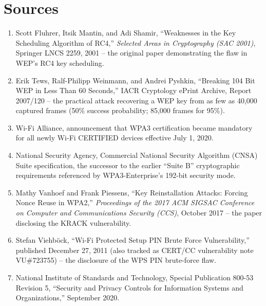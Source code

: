 \section*{Sources}
\begin{enumerate}[label=\lbrack\arabic*\rbrack, leftmargin=2.2em]
\item {}Scott Fluhrer, Itsik Mantin, and Adi Shamir, ``Weaknesses in the Key Scheduling
Algorithm of RC4,'' \emph{Selected Areas in Cryptography (SAC 2001)}, Springer LNCS 2259, 2001 --
the original paper demonstrating the flaw in WEP's RC4 key scheduling.
\item {}Erik Tews, Ralf-Philipp Weinmann, and Andrei Pyshkin, ``Breaking 104 Bit WEP
in Less Than 60 Seconds,'' IACR Cryptology ePrint Archive, Report 2007/120 -- the practical attack
recovering a WEP key from as few as 40{,}000 captured frames (50\% success probability; 85{,}000
frames for 95\%).
\item {}Wi-Fi Alliance, announcement that WPA3 certification became mandatory for all
newly Wi-Fi CERTIFIED devices effective July 1, 2020.
\item {}National Security Agency, Commercial National Security Algorithm (CNSA) Suite
specification, the successor to the earlier ``Suite B'' cryptographic requirements referenced by
WPA3-Enterprise's 192-bit security mode.
\item {}Mathy Vanhoef and Frank Piessens, ``Key Reinstallation Attacks: Forcing Nonce
Reuse in WPA2,'' \emph{Proceedings of the 2017 ACM SIGSAC Conference on Computer and Communications
Security (CCS)}, October 2017 -- the paper disclosing the KRACK vulnerability.
\item {}Stefan Viehb\"ock, ``Wi-Fi Protected Setup PIN Brute Force Vulnerability,''
published December 27, 2011 (also tracked as CERT/CC vulnerability note VU\#723755) -- the
disclosure of the WPS PIN brute-force flaw.
\item {}National Institute of Standards and Technology, Special Publication 800-53
Revision 5, ``Security and Privacy Controls for Information Systems and Organizations,'' September
2020.
\end{enumerate}
